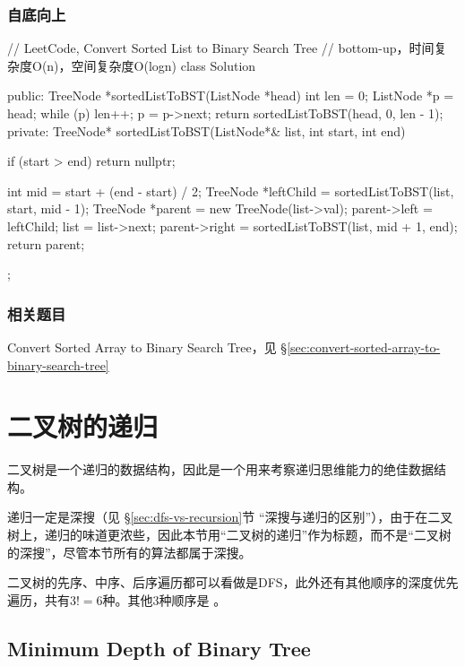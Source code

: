 \subsubsection{自底向上}
\begin{Code}
// LeetCode, Convert Sorted List to Binary Search Tree
// bottom-up，时间复杂度O(n)，空间复杂度O(logn)
class Solution {
public:
    TreeNode *sortedListToBST(ListNode *head) {
        int len = 0;
        ListNode *p = head;
        while (p) {
            len++;
            p = p->next;
        }
        return sortedListToBST(head, 0, len - 1);
    }
private:
    TreeNode* sortedListToBST(ListNode*& list, int start, int end) {
        if (start > end) return nullptr;

        int mid = start + (end - start) / 2;
        TreeNode *leftChild = sortedListToBST(list, start, mid - 1);
        TreeNode *parent = new TreeNode(list->val);
        parent->left = leftChild;
        list = list->next;
        parent->right = sortedListToBST(list, mid + 1, end);
        return parent;
    }
};
\end{Code}


\subsubsection{相关题目}
\begindot
\item Convert Sorted Array to Binary Search Tree，见 \S \ref{sec:convert-sorted-array-to-binary-search-tree}
\myenddot


\section{二叉树的递归} %
二叉树是一个递归的数据结构，因此是一个用来考察递归思维能力的绝佳数据结构。

递归一定是深搜（见 \S \ref{sec:dfs-vs-recursion}节 “深搜与递归的区别”），由于在二叉树上，递归的味道更浓些，因此本节用“二叉树的递归”作为标题，而不是“二叉树的深搜”，尽管本节所有的算法都属于深搜。

二叉树的先序、中序、后序遍历都可以看做是DFS，此外还有其他顺序的深度优先遍历，共有$3!=6$种。其他3种顺序是 。


\subsection{Minimum Depth of Binary Tree}
\label{sec:minimum-depth-of-binary-tree}



